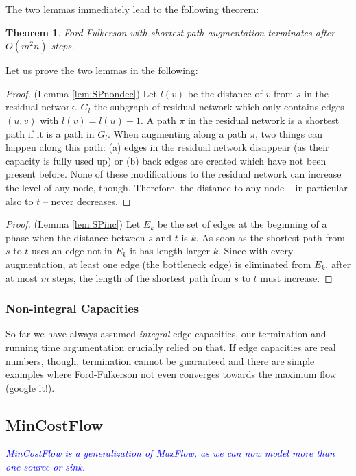 \documentclass{article}
\newtheorem{theorem}{Theorem}
\begin{document}
The two lemmas immediately lead to the following theorem:
\begin{theorem}
Ford-Fulkerson with shortest-path augmentation terminates after $O(m^2n)$ steps.
\end{theorem}

Let us prove the two lemmas in the following:
\begin{proof}(Lemma \ref{lem:SPnondec})
Let $l(v)$ be the distance of $v$ from $s$ in the residual network. $G_l$ the subgraph of residual network which only contains edges $(u,v)$ with $l(v)=l(u)+1$. A path $\pi$ in the residual network is a shortest path if it is a path in $G_l$. When augmenting along a path $\pi$, two things can happen along this path: (a) edges in the residual network disappear (as their capacity is fully used up) or (b) back edges are created which have not been present before. None of these modifications to the residual network can increase the level of any node, though. Therefore, the distance to any node -- in particular also to $t$ -- never decreases.
\end{proof}

\begin{proof}(Lemma \ref{lem:SPinc})
Let $E_k$ be the set of edges at the beginning of a phase when the distance between $s$ and $t$ is $k$. As soon as the shortest path from $s$ to $t$ uses an edge not in $E_k$ it has length larger $k$. Since with every augmentation, at least one edge (the bottleneck edge) is eliminated from $E_k$, after at most $m$ steps, the length of the shortest path from $s$ to $t$ must increase.
\end{proof}

\subsubsection{Non-integral Capacities}
So far we have always assumed \emph{integral} edge capacities, our termination and running time argumentation crucially relied on that. If edge capacities are real numbers, though, termination cannot be guaranteed and there are simple examples where Ford-Fulkerson not even converges towards the maximum flow (google it!).



\subsection{MinCostFlow}
\textcolor{blue}{\emph{MinCostFlow is a generalization of MaxFlow, as we can now model more than one source or sink.}}
\end{document}
